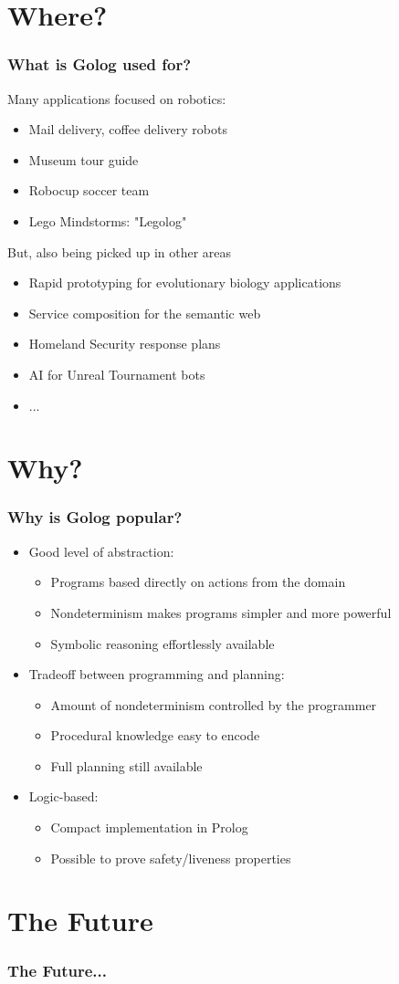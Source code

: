 \documentclass{beamer}
\begin{document}
\section{Where?}
\begin{frame}
\frametitle{What is Golog used for?}
Many applications focused on robotics:
\begin{itemize}
  \item Mail delivery, coffee delivery robots
  \item Museum tour guide
  \item Robocup soccer team
  \item Lego Mindstorms: "Legolog"
\end{itemize}
\pause
But, also being picked up in other areas
\begin{itemize}
  \item Rapid prototyping for evolutionary biology applications
  \item Service composition for the semantic web
  \item Homeland Security response plans
  \item AI for Unreal Tournament bots
  \item ...
\end{itemize}
\end{frame}

\section{Why?}
\begin{frame}
\frametitle{Why is Golog popular?}
\begin{itemize}
  \item Good level of abstraction:
  \begin{itemize}
    \item Programs based directly on actions from the domain
    \item Nondeterminism makes programs simpler and more powerful
    \item Symbolic reasoning effortlessly available
  \end{itemize}
  \item Tradeoff between programming and planning:
  \begin{itemize}
    \item Amount of nondeterminism controlled by the programmer
    \item Procedural knowledge easy to encode
    \item Full planning still available
  \end{itemize}
  \item Logic-based:
  \begin{itemize}
    \item Compact implementation in Prolog
    \item Possible to prove safety/liveness properties
  \end{itemize}
\end{itemize}
\end{frame}


\section{The Future}
\begin{frame}
\frametitle{The Future...}
\end{frame}
\end{document}
